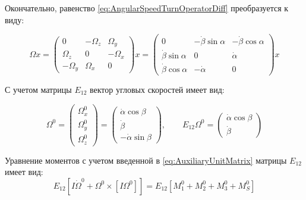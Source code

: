 Окончательно, равенство \ref{eq:AngularSpeedTurnOperatorDiff} преобразуется к виду:

\begin{equation}
\label{eq:AngularSpeedTurnOperatorDiff2}
\Omega x = \begin{pmatrix}
0 & -\Omega_z & \Omega_y \\
\Omega_z & 0 & -\Omega_x \\
-\Omega_y & \Omega_x & 0
\end{pmatrix}x = \begin{pmatrix}
0 & -\dot{\beta}\sin{\alpha} & -\dot{\beta}\cos{\alpha} \\
\dot{\beta}\sin{\alpha} & 0 & \dot{\alpha} \\
\dot{\beta}\cos{\alpha} & -\dot{\alpha} & 0
\end{pmatrix}x
\end{equation}

С учетом матрицы $E_{12}$ вектор угловых скоростей имеет вид:

\begin{equation}
\label{eq:AngularSpeedInMovingCS}
\Omega^0 = \begin{pmatrix}
\Omega_x^0 \\ \Omega_y^0 \\ \Omega_z^0
\end{pmatrix} =
\begin{pmatrix}
\dot{\alpha}\cos{\beta} \\ \dot{\beta} \\ -\dot{\alpha}\sin{\beta}
\end{pmatrix},\qquad
E_{12}\Omega^0 =
\begin{pmatrix}
\dot{\alpha}\cos{\beta} \\ \dot{\beta}
\end{pmatrix}
\end{equation}

Уравнение моментов с учетом введенной в \ref{eq:AuxiliaryUnitMatrix} матрицы $E_{12}$ имеет вид:
\begin{equation}
\label{eq:TorquesEqCommon}
E_{12}\left[I\dot{\Omega}^0 + \Omega^0 \times \left[I\Omega^0\right] \right] =
E_{12}\left[M_1^0 + M_2^0 + M_3^0 + M_S^0\right]
\end{equation}

